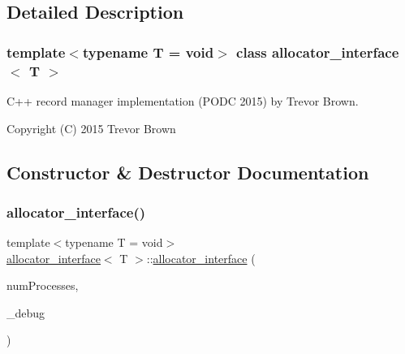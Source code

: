 \subsection{Detailed Description}
\subsubsection*{template$<$typename T = void$>$\newline
class allocator\+\_\+interface$<$ T $>$}

C++ record manager implementation (P\+O\+DC 2015) by Trevor Brown.

Copyright (C) 2015 Trevor Brown 

\subsection{Constructor \& Destructor Documentation}
\mbox{\label{classallocator__interface_a644535371130ddfa03b9c31826697dbd}} 
\subsubsection{\texorpdfstring{allocator\+\_\+interface()}{allocator\_interface()}}
{\footnotesize\ttfamily template$<$typename T  = void$>$ \\
\hyperlink{classallocator__interface}{allocator\+\_\+interface}$<$ T $>$\+::\hyperlink{classallocator__interface}{allocator\+\_\+interface} (\begin{DoxyParamCaption}\item[{const int}]{num\+Processes,  }\item[{\hyperlink{classdebugInfo}{debug\+Info} $\ast$const}]{\+\_\+debug }\end{DoxyParamCaption})\hspace{0.3cm}{\ttfamily [inline]}}

\mbox{\label{classallocator__interface_a8124a05dc7a241ec2fc6e4292e0636d1}} 
